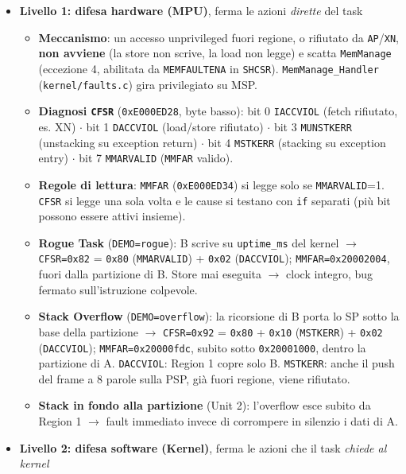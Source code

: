 \begin{itemize}
    \item \textbf{Livello 1: difesa hardware (MPU)}, ferma le azioni \textit{dirette} del task
    \begin{itemize}
        \item \textbf{Meccanismo}: un accesso unprivileged fuori regione, o rifiutato da \texttt{AP}/\texttt{XN}, \textbf{non avviene} (la store non scrive, la load non legge) e scatta \texttt{MemManage} (eccezione 4, abilitata da \texttt{MEMFAULTENA} in \texttt{SHCSR}). \texttt{MemManage\_Handler} (\texttt{kernel/faults.c}) gira privilegiato su MSP.
        \item \textbf{Diagnosi \texttt{CFSR}} (\texttt{0xE000ED28}, byte basso): bit 0 \texttt{IACCVIOL} (fetch rifiutato, es. XN) $\cdot$ bit 1 \texttt{DACCVIOL} (load/store rifiutato) $\cdot$ bit 3 \texttt{MUNSTKERR} (unstacking su exception return) $\cdot$ bit 4 \texttt{MSTKERR} (stacking su exception entry) $\cdot$ bit 7 \texttt{MMARVALID} (\texttt{MMFAR} valido).
        \item \textbf{Regole di lettura}: \texttt{MMFAR} (\texttt{0xE000ED34}) si legge solo se \texttt{MMARVALID}=1. \texttt{CFSR} si legge una sola volta e le cause si testano con \texttt{if} separati (più bit possono essere attivi insieme).
        \item \textbf{Rogue Task} (\texttt{DEMO=rogue}): B scrive su \texttt{uptime\_ms} del kernel $\rightarrow$ \texttt{CFSR=0x82} = \texttt{0x80} (\texttt{MMARVALID}) + \texttt{0x02} (\texttt{DACCVIOL}); \texttt{MMFAR=0x20002004}, fuori dalla partizione di B. Store mai eseguita $\rightarrow$ clock integro, bug fermato sull'istruzione colpevole.
        \item \textbf{Stack Overflow} (\texttt{DEMO=overflow}): la ricorsione di B porta lo SP sotto la base della partizione $\rightarrow$ \texttt{CFSR=0x92} = \texttt{0x80} + \texttt{0x10} (\texttt{MSTKERR}) + \texttt{0x02} (\texttt{DACCVIOL}); \texttt{MMFAR=0x20000fdc}, subito sotto \texttt{0x20001000}, dentro la partizione di A. \texttt{DACCVIOL}: Region 1 copre solo B. \texttt{MSTKERR}: anche il push del frame a 8 parole sulla PSP, già fuori regione, viene rifiutato.
        \item \textbf{Stack in fondo alla partizione} (Unit 2): l'overflow esce subito da Region 1 $\rightarrow$ fault immediato invece di corrompere in silenzio i dati di A.
    \end{itemize}
    \item \textbf{Livello 2: difesa software (Kernel)}, ferma le azioni che il task \textit{chiede al kernel}

\end{itemize}

